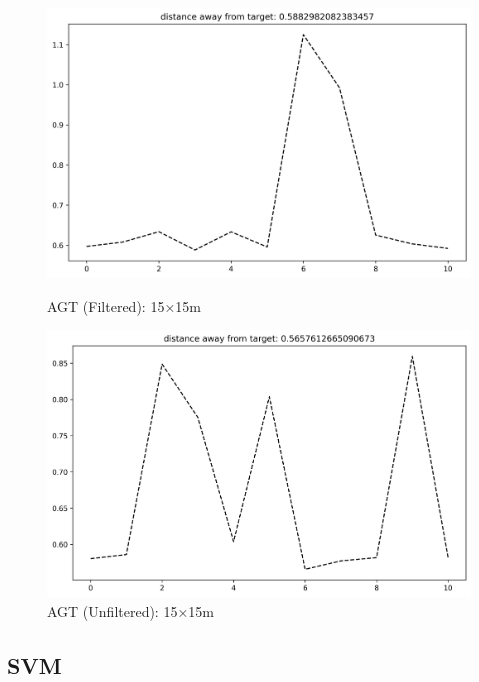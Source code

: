 \documentclass[runningheads]{llncs}
\begin{document}
\begin{figure}[H]
	\centering
	\begin{minipage}{0.49\textwidth}
		\centering
		\includegraphics[width=\textwidth]{figures/filtered/mlp_custom_15.png}
		\caption*{AGT (Filtered): 15×15m}
	\end{minipage}
	\hfill
	\begin{minipage}{0.49\textwidth}
		\centering
		\includegraphics[width=\textwidth]{figures/unfiltered/mlp_custom_15.png}
		\caption*{AGT (Unfiltered): 15×15m}
	\end{minipage}
\end{figure}

\clearpage

\subsection*{SVM}
\end{document}
